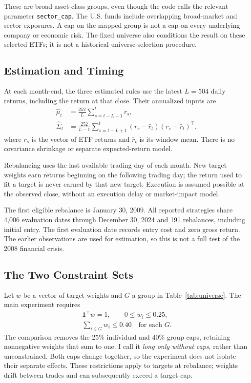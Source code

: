 \documentclass[conference]{IEEEtran}
\begin{document}
These are broad asset-class groups, even though the code calls the relevant parameter \texttt{sector\_cap}. The U.S. funds include overlapping broad-market and sector exposures. A cap on the mapped group is not a cap on every underlying company or economic risk. The fixed universe also conditions the result on these selected ETFs; it is not a historical universe-selection procedure.

\subsection{Estimation and Timing}
At each month-end, the three estimated rules use the latest $L=504$ daily returns, including the return at that close. Their annualized inputs are
\begin{align}
 \widehat\mu_t &= \frac{252}{L}\sum_{s=t-L+1}^{t}r_s,\\
 \widehat\Sigma_t &= \frac{252}{L-1}\sum_{s=t-L+1}^{t}
 (r_s-\bar r_t)(r_s-\bar r_t)^\top,
\end{align}
where $r_s$ is the vector of ETF returns and $\bar r_t$ is its window mean. There is no covariance shrinkage or separate expected-return model.

Rebalancing uses the last available trading day of each month. New target weights earn returns beginning on the following trading day; the return used to fit a target is never earned by that new target. Execution is assumed possible at the observed close, without an execution delay or market-impact model.

The first eligible rebalance is January 30, 2009. All reported strategies share 4,006 evaluation dates through December 30, 2024 and 191 rebalances, including initial entry. The first evaluation date records entry cost and zero gross return. The earlier observations are used for estimation, so this is not a full test of the 2008 financial crisis.

\subsection{The Two Constraint Sets}
Let $w$ be a vector of target weights and $G$ a group in Table~\ref{tab:universe}. The main experiment requires
\begin{equation}
 \begin{gathered}
 \mathbf{1}^\top w=1,\qquad 0\leq w_i\leq0.25,\\
 \sum_{i\in G}w_i\leq0.40\quad\text{for each }G.
 \end{gathered}
 \label{eq:caps}
\end{equation}
The comparison removes the 25\% individual and 40\% group caps, retaining nonnegative weights that sum to one. I call it \emph{long only without caps}, rather than unconstrained. Both caps change together, so the experiment does not isolate their separate effects. These restrictions apply to targets at rebalance; weights drift between trades and can subsequently exceed a target cap.
\end{document}
